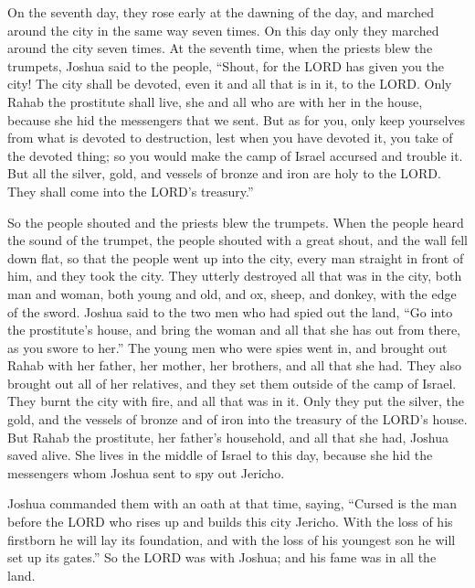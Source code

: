  On the seventh day, they rose early at the dawning of the
day, and marched around the city in the same way seven times. On this
day only they marched around the city seven times.  At the
seventh time, when the priests blew the trumpets, Joshua said to the
people, ``Shout, for the LORD has given you the city!  The
city shall be devoted, even it and all that is in it, to the LORD. Only
Rahab the prostitute shall live, she and all who are with her in the
house, because she hid the messengers that we sent.  But as
for you, only keep yourselves from what is devoted to destruction, lest
when you have devoted it, you take of the devoted thing; so you would
make the camp of Israel accursed and trouble it.  But all
the silver, gold, and vessels of bronze and iron are holy to the LORD.
They shall come into the LORD's treasury.''

 So the people shouted and the priests blew the trumpets.
When the people heard the sound of the trumpet, the people shouted with
a great shout, and the wall fell down flat, so that the people went up
into the city, every man straight in front of him, and they took the
city.  They utterly destroyed all that was in the city,
both man and woman, both young and old, and ox, sheep, and donkey, with
the edge of the sword.  Joshua said to the two men who had
spied out the land, ``Go into the prostitute's house, and bring the
woman and all that she has out from there, as you swore to her.''
 The young men who were spies went in, and brought out
Rahab with her father, her mother, her brothers, and all that she had.
They also brought out all of her relatives, and they set them outside of
the camp of Israel.  They burnt the city with fire, and all
that was in it. Only they put the silver, the gold, and the vessels of
bronze and of iron into the treasury of the LORD's house. 
But Rahab the prostitute, her father's household, and all that she had,
Joshua saved alive. She lives in the middle of Israel to this day,
because she hid the messengers whom Joshua sent to spy out Jericho.

 Joshua commanded them with an oath at that time, saying,
``Cursed is the man before the LORD who rises up and builds this city
Jericho. With the loss of his firstborn he will lay its foundation, and
with the loss of his youngest son he will set up its gates.''
 So the LORD was with Joshua; and his fame was in all the
land.

